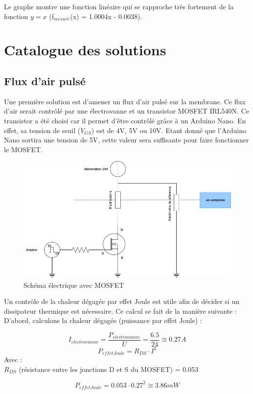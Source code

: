 Le graphe montre une fonction linéaire qui se rapproche très fortement de la fonction $y = x$ (f$_{mesur\acute{e}}$(x) = 1.0004x - 0.0038).

\section{Catalogue des solutions}
\subsection{Flux d'air pulsé}
Une première solution est d'amener un flux d'air pulsé sur la membrane. Ce flux d'air serait contrôlé par une électrovanne et un
transistor MOSFET IRL540N. Ce transistor a été choisi car il permet d'être contrôlé grâce à un Arduino Nano. En effet, sa tension de seuil
($V_{GS}$) est de 4V, 5V ou 10V. Etant donné que l'Arduino Nano sortira une tension de 5V, cette valeur sera suffisante pour faire fonctionner
le MOSFET.
\begin{figure}[H]
    \centering
    \includegraphics[scale=0.6]{assets/figures/MOSFET.png}
    \caption{Schéma électrique avec MOSFET}
    \label{fig:MOSFET}
\end{figure}
Un contrôle de la chaleur dégagée par effet Joule est utile afin de décider si un dissipateur thermique est nécessaire. Ce calcul se fait
de la manière suivante :\\
D'abord, calculons la chaleur dégagée (puissance par effet Joule) :

\[I_{electrovanne} = \frac{P_{electrovanne}}{U} = \frac{6.5}{24} \cong 0.27 A \]
\[P_{effetJoule} = R_{DS}\cdot I^2\]
Avec :\\
$R_{DS}$ (résistance entre les jonctions D et S du MOSFET) = 0.053

\begin{equation}
    P_{effetJoule} = 0.053\cdot 0.27^2 \cong 3.86mW
\end{equation}


